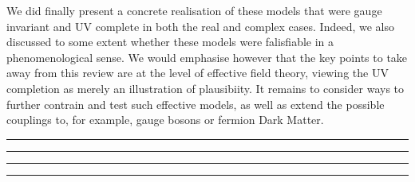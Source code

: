 \documentclass[10pt]{article}
\begin{document}
We did finally present a concrete realisation of these models that were gauge invariant and UV complete in both the real and complex cases. Indeed, we also discussed to some extent whether these models were falisfiable in a phenomenological sense. We would emphasise however that the key points to take away from this review are at the level of effective field theory, viewing the UV completion as merely an illustration of plausibiity. It remains to consider ways to further contrain and test such effective models, as well as extend the possible couplings to, for example, gauge bosons or fermion Dark Matter.
\vspace{20pt}
\hrule
\vspace{1pt}
\hrule
\vspace{3pt}

\vspace{15pt}
\hrule
\vspace{1pt}
\hrule
\end{document}
